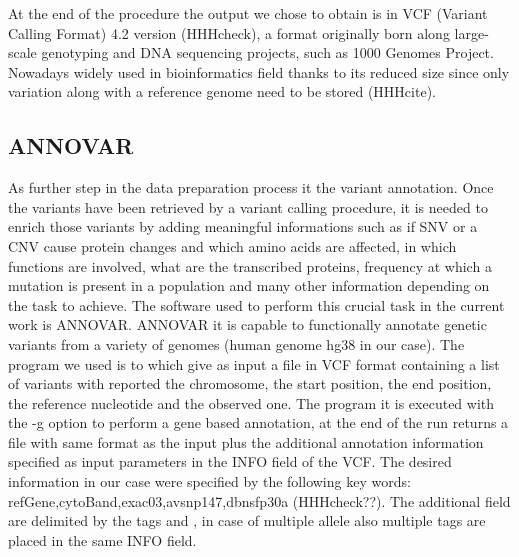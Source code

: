At the end of the procedure the output we chose to obtain is in VCF (Variant Calling Format) 4.2 version (HHHcheck), a format originally born along large-scale genotyping and DNA sequencing projects, such as 1000 Genomes Project. Nowadays widely used in bioinformatics field thanks to its reduced size since only variation along with a reference genome need to be stored (HHHcite).  


\subsection{ANNOVAR}
As further step in the data preparation process it the variant annotation. Once the variants have been retrieved by a variant calling procedure, it is needed to enrich those variants by adding meaningful informations such as if SNV or a CNV cause protein changes and which amino acids are affected, in which functions are involved, what are the transcribed proteins, frequency at which a mutation is present in a population and many other information depending on the task to achieve. The software used to perform this crucial task in the current work is ANNOVAR. 
ANNOVAR it is capable to functionally annotate genetic variants from a variety of genomes (human genome hg38 in our case). The program we used is  to which give as input a file in VCF format containing a list of variants with reported the chromosome, the start position, the end position, the reference nucleotide and the observed one. The program it is executed with the -g option to perform a gene based annotation, at the end of the run returns a file with same format as the input plus the additional annotation information specified as input parameters in the INFO field of the VCF. The desired information in our case were specified by the following key words: refGene,cytoBand,exac03,avsnp147,dbnsfp30a (HHHcheck??). The additional field are delimited by the tags  and , in case of multiple allele also multiple tags are placed in the same INFO field.


